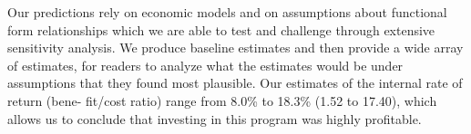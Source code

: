 Our predictions rely on economic models and on assumptions about functional form relationships which we are able to test and challenge through extensive sensitivity analysis. We produce baseline estimates and then provide a wide array of estimates, for readers to analyze what the estimates would be under assumptions that they found most plausible. Our estimates of the internal rate of return (bene- fit/cost ratio) range from 8.0\% to 18.3\% (1.52 to 17.40), which allows us to conclude that investing in this program was highly profitable. 

\clearpage

\singlespace



 